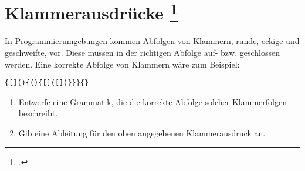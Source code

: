 \documentclass{lehramt-informatik-aufgabe}
\begin{document}
\section{Klammerausdrücke
\footcite{theo:ab:2}}

In Programmierumgebungen kommen Abfolgen von Klammern, runde, eckige und
geschweifte, vor. Diese müssen in der richtigen Abfolge auf- bzw.
geschlossen werden. Eine korrekte Abfolge von Klammern wäre zum
Beispiel:

\begin{verbatim}
{[](){(){[]([])}}}{}
\end{verbatim}

\begin{enumerate}


\item Entwerfe eine Grammatik, die die korrekte Abfolge solcher
Klammerfolgen beschreibt.


\item Gib eine Ableitung für den oben angegebenen Klammerausdruck an.

\end{enumerate}
\end{document}
